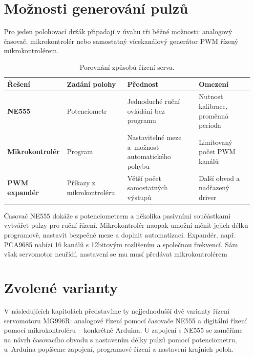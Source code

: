 \section{Možnosti generování pulzů}

Pro jeden polohovací držák připadají v úvahu tři běžné možnosti: analogový časovač, mikrokontrolér nebo samostatný vícekanálový generátor PWM řízený mikrokontrolérem.

\begin{table}[htbp]\centering\small
\caption{Porovnání způsobů řízení serva.}
\renewcommand{\arraystretch}{1.25}
\begin{tabularx}{\textwidth}{@{}>{\raggedright\arraybackslash}p{27mm}YYY@{}}\toprule
\textbf{Řešení} & \textbf{Zadání polohy} & \textbf{Přednost} & \textbf{Omezení}\\\midrule
\textbf{NE555} & Potenciometr & Jednoduché ruční ovládání bez programu & Nutnost kalibrace, proměnná perioda\\\addlinespace[5pt]\midrule
\textbf{Mikrokontrolér} & Program & Nastavitelné meze a~možnost automatického pohybu & Limitovaný počet PWM kanálů\\\addlinespace[5pt]\midrule
\textbf{PWM expandér} & Příkazy z mikrokontroléru & Větší počet samostatných výstupů & Další obvod a nadřazený driver\\\bottomrule
\end{tabularx}
\end{table}

Časovač NE555 dokáže s potenciometrem a několika pasivními součástkami vytvářet pulzy pro ruční řízení. Mikrokontrolér naopak umožní měnit jejich délku programově, nastavit bezpečné meze a doplnit automatizaci. Expandér, např. PCA9685 nabízí 16 kanálů s 12bitovým rozlišením a společnou frekvencí. Sám však servomotor neuřídí, nastavení se mu musí předávat mikrokontrolérem~\cite{pca}

\section{Zvolené varianty}

V následujících kapitolách představíme ty nejjednodušší dvě varianty řízení servomotoru MG996R: analogové řízení pomocí časovače NE555 a digitální řízení pomocí mikrokontroléru -- konkrétně Arduina. U zapojení s NE555 se zaměříme na návrh časovacího obvodu s nastavením délky pulzů pomocí potenciometru, u~Arduina popíšeme zapojení, programové řízení a nastavení krajních poloh.